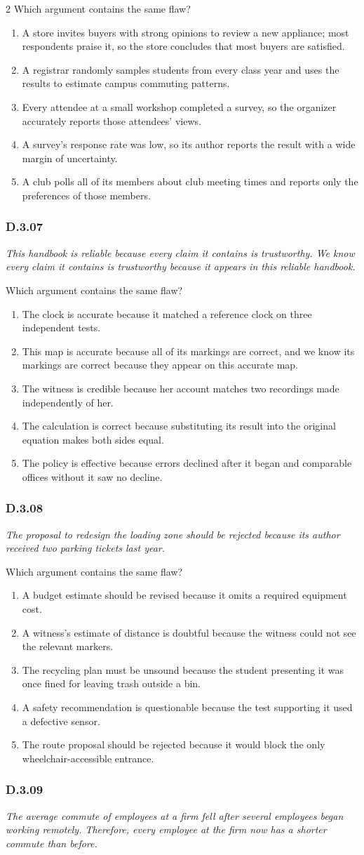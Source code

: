 \documentclass[10pt]{extarticle}
\newcommand{\choice}[1]{\item #1}
\newcommand{\bankitem}[1]{\subsubsection*{#1}}
\begin{document}
\begin{multicols}{2}
Which argument contains the same flaw?
\begin{enumerate}[label=(\alph*)]
  \choice{A store invites buyers with strong opinions to review a new appliance; most respondents praise it, so the store concludes that most buyers are satisfied.}
  \choice{A registrar randomly samples students from every class year and uses the results to estimate campus commuting patterns.}
  \choice{Every attendee at a small workshop completed a survey, so the organizer accurately reports those attendees' views.}
  \choice{A survey's response rate was low, so its author reports the result with a wide margin of uncertainty.}
  \choice{A club polls all of its members about club meeting times and reports only the preferences of those members.}
\end{enumerate}
\bankitem{D.3.07}
\emph{This handbook is reliable because every claim it contains is trustworthy. We know every claim it contains is trustworthy because it appears in this reliable handbook.}

Which argument contains the same flaw?
\begin{enumerate}[label=(\alph*)]
  \choice{The clock is accurate because it matched a reference clock on three independent tests.}
  \choice{This map is accurate because all of its markings are correct, and we know its markings are correct because they appear on this accurate map.}
  \choice{The witness is credible because her account matches two recordings made independently of her.}
  \choice{The calculation is correct because substituting its result into the original equation makes both sides equal.}
  \choice{The policy is effective because errors declined after it began and comparable offices without it saw no decline.}
\end{enumerate}
\bankitem{D.3.08}
\emph{The proposal to redesign the loading zone should be rejected because its author received two parking tickets last year.}

Which argument contains the same flaw?
\begin{enumerate}[label=(\alph*)]
  \choice{A budget estimate should be revised because it omits a required equipment cost.}
  \choice{A witness's estimate of distance is doubtful because the witness could not see the relevant markers.}
  \choice{The recycling plan must be unsound because the student presenting it was once fined for leaving trash outside a bin.}
  \choice{A safety recommendation is questionable because the test supporting it used a defective sensor.}
  \choice{The route proposal should be rejected because it would block the only wheelchair-accessible entrance.}
\end{enumerate}
\bankitem{D.3.09}
\emph{The average commute of employees at a firm fell after several employees began working remotely. Therefore, every employee at the firm now has a shorter commute than before.}


\end{multicols}
\end{document}
